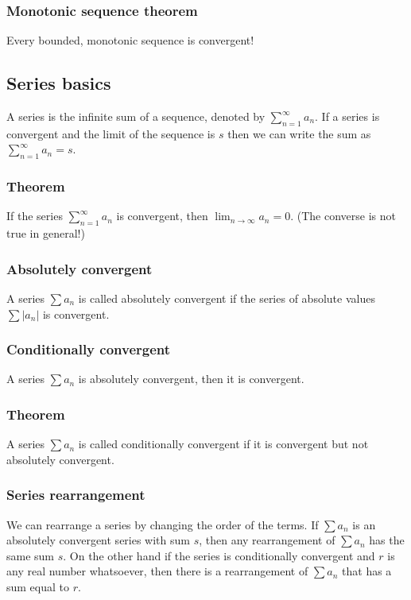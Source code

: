 \documentclass[a4paper]{article}
\begin{document}
\subsubsection*{Monotonic sequence theorem}
Every bounded, monotonic sequence is convergent!

\subsection{Series basics}
A series is the infinite sum of a sequence, denoted by $\sum_{n=1}^{\infty}a_n$. If a series is convergent and the limit of the sequence is $s$ then we can write the sum as $\sum_{n=1}^{\infty}a_n=s$.

\subsubsection*{Theorem}
If the series $\sum_{n=1}^{\infty}a_n$ is convergent, then $\lim_{n\rightarrow\infty} a_n=0$. (The converse is not true in general!)

\subsubsection*{Absolutely convergent}
A series $\sum a_n$ is called absolutely convergent if the series of absolute values $\sum |a_n|$ is convergent.

\subsubsection*{Conditionally convergent}
A series $\sum a_n$ is absolutely convergent, then it is convergent.

\subsubsection*{Theorem}
A series $\sum a_n$ is called conditionally convergent if it is convergent but not absolutely convergent.

\subsubsection*{Series rearrangement}
We can rearrange a series by changing the order of the terms. If $\sum a_n$ is an absolutely convergent series with sum $s$, then any rearrangement of $\sum a_n$ has the same sum $s$. On the other hand if the series is conditionally convergent and $r$ is any real number whatsoever, then there is a rearrangement of $\sum a_n$ that has a sum equal to $r$.
\end{document}
